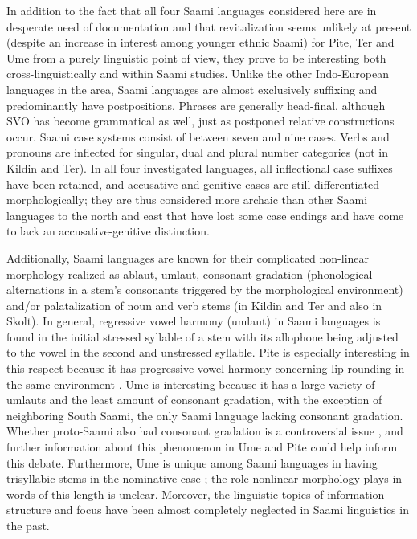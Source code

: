 \documentclass[a4paper,12pt]{article}
\begin{document}
In addition to the fact that all four Saami languages considered here are in desperate need of documentation and that revitalization seems unlikely at present (despite an increase in interest among younger ethnic Saami) for Pite, Ter and Ume from a purely linguistic point of view, they prove to be interesting both cross-linguistically and within Saami studies. Unlike the other Indo-European languages in the area, Saami languages are almost exclusively suffixing and predominantly have postpositions. Phrases are generally head-final, although SVO has become grammatical as well, just as postponed relative constructions occur. Saami case systems consist of between seven and nine cases. Verbs and pronouns are inflected for singular, dual and plural number categories (not in Kildin and Ter). In all four investigated languages, all inflectional case suffixes have been retained, and accusative and genitive cases are still differentiated morphologically; they are thus considered more archaic than other Saami languages to the north and east that have lost some case endings and have come to lack an accusative-genitive distinction. %

Additionally, Saami languages are known for their complicated non-linear morphology realized as ablaut, umlaut, consonant gradation (phonological alternations in a stem's consonants triggered by the morphological environment) and/or palatalization of noun and verb stems (in Kildin and Ter and also in Skolt). In general, regressive vowel harmony (umlaut) in Saami languages is found in the initial stressed syllable of a stem with its allophone being adjusted to the vowel in the second and unstressed syllable. Pite is especially interesting in this respect because it has progressive vowel harmony concerning lip rounding in the same environment \cite[272]{korhonen2005a}. Ume is interesting because it has a large variety of umlauts and the least amount of consonant gradation, with the exception of neighboring South Saami, the only Saami language lacking consonant gradation. Whether proto-Saami also had consonant gradation is a controversial issue \cite[cf.][154–55]{svonni2006}, and further information about this phenomenon in Ume and Pite could help inform this debate. Furthermore, Ume is unique among Saami languages in having trisyllabic stems in the nominative case \cite[421]{korhonen2005b}; the role nonlinear morphology plays in words of this length is unclear. Moreover, the linguistic topics of information structure and focus have been almost completely neglected in Saami linguistics in the past.
\end{document}
